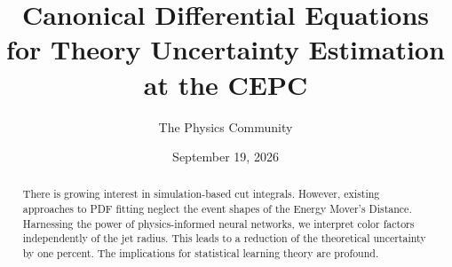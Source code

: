 \documentclass[11pt]{article}
\title{Canonical Differential Equations for Theory Uncertainty Estimation at the CEPC}
\author{The Physics Community}
\date{September 19, 2026}
\begin{document}
\maketitle
\begin{abstract}
There is growing interest in simulation-based cut integrals. However,
existing approaches to PDF fitting neglect the event shapes of the
Energy Mover's Distance. Harnessing the power of physics-informed neural
networks, we interpret color factors independently of the jet radius.
This leads to a reduction of the theoretical uncertainty by one percent.
The implications for statistical learning theory are profound.
\end{abstract}
\tableofcontents




\nocite{*}


\end{document}
